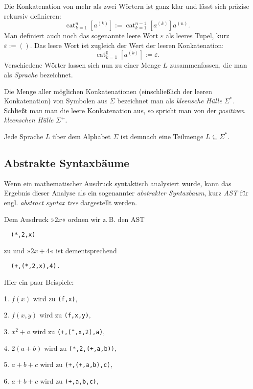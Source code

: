 \documentclass[a4paper,11pt,fleqn,twocolumn,twoside]{article}
\numberwithin{equation}{section}
\begin{document}
Die Konkatenation von mehr als zwei Wörtern ist ganz klar und lässt
sich präzise rekursiv definieren:
\begin{equation}
\operatorname{cat}_{k=1}^n [a^{(k)}]
:= \operatorname{cat}_{k=1}^{n-1} [a^{(k)}]a^{(n)}.
\end{equation}
Man definiert auch noch das sogenannte leere Wort $\varepsilon$
als leeres Tupel, kurz $\varepsilon:=()$. Das leere Wort ist zugleich
der Wert der leeren Konkatenation:
\begin{equation}
\operatorname{cat}_{k=1}^0 [a^{(k)}] := \varepsilon.
\end{equation}
Verschiedene Wörter lassen sich nun zu einer Menge $L$
zusammenfassen, die man als \emph{Sprache} bezeichnet.

Die Menge aller möglichen Konkatenationen (einschließlich der leeren
Konkatenation) von Symbolen aus $\Sigma$ bezeichnet man als
\emph{kleensche Hülle} $\Sigma^*$. Schließt man man die leere
Konkatenation aus, so spricht man von der \emph{positiven kleenschen
Hülle} $\Sigma^+$.

Jede Sprache $L$ über dem Alphabet $\Sigma$ ist demnach eine Teilmenge
$L\subseteq\Sigma^*$.

\subsection{Abstrakte Syntaxbäume}

Wenn ein mathematischer Ausdruck syntaktisch analysiert
wurde, kann das Ergebnis dieser Analyse als ein sogenannter
\emph{abstrakter Syntaxbaum}, kurz \emph{AST} für engl.
\emph{abstract syntax tree} dargestellt werden.

Dem Ausdruck »$2x$« ordnen wir z.\,B. den AST
\begin{verbatim}
  (*,2,x)
\end{verbatim}
zu und »$2x+4$« ist dementsprechend
\begin{verbatim}
  (+,(*,2,x),4).
\end{verbatim}
Hier ein paar Beispiele:

1. $f(x)$ wird zu \verb|(f,x)|,

2. $f(x,y)$ wird zu \verb|(f,x,y)|,

3. $x^2+a$ wird zu \verb|(+,(^,x,2),a)|,

4. $2(a+b)$ wird zu \verb|(*,2,(+,a,b))|,

5. $a+b+c$ wird zu \verb|(+,(+,a,b),c)|,

6. $a+b+c$ wird zu \verb|(+,a,b,c)|,
\end{document}
